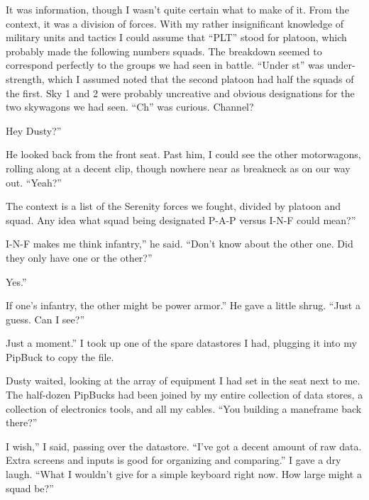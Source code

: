 
It was information, though I wasn’t quite certain what to make of it. From the context, it was a division of forces. With my rather insignificant knowledge of military units and tactics I could assume that “PLT” stood for platoon, which probably made the following numbers squads. The breakdown seemed to correspond perfectly to the groups we had seen in battle. “Under st” was under-strength, which I assumed noted that the second platoon had half the squads of the first. Sky 1 and 2 were probably uncreative and obvious designations for the two skywagons we had seen. “Ch” was curious. Channel?

\leavevmode{}Hey Dusty?”

He looked back from the front seat. Past him, I could see the other motorwagons, rolling along at a decent clip, though nowhere near as breakneck as on our way out. “Yeah?”

\leavevmode{}The context is a list of the Serenity forces we fought, divided by platoon and squad. Any idea what squad being designated P-A-P versus I-N-F could mean?”

\leavevmode{}I-N-F makes me think infantry,” he said. “Don’t know about the other one. Did they only have one or the other?”

\leavevmode{}Yes.”

\leavevmode{}If one’s infantry, the other might be power armor.” He gave a little shrug. “Just a guess. Can I see?”

\leavevmode{}Just a moment.” I took up one of the spare datastores I had, plugging it into my PipBuck to copy the file.

Dusty waited, looking at the array of equipment I had set in the seat next to me. The half-dozen PipBucks had been joined by my entire collection of data stores, a collection of electronics tools, and all my cables. “You building a maneframe back there?”

\leavevmode{}I wish,” I said, passing over the datastore. “I’ve got a decent amount of raw data. Extra screens and inputs is good for organizing and comparing.” I gave a dry laugh. “What I wouldn’t give for a simple keyboard right now. How large might a squad be?”

